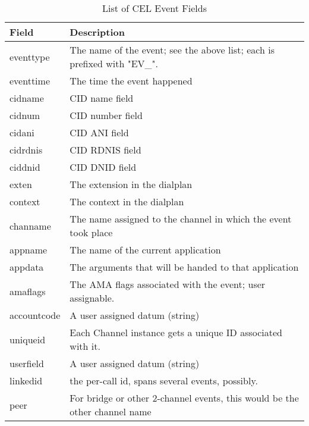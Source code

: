 \begin{table}[h]
  \begin{tabular}{ | l | p{10cm} | }
    \hline
    Field         & Description                                                                \\ \hline \hline
    eventtype     & The name of the event; see the above list; each is prefixed with "EV\_".   \\ \hline
    eventtime     & The time the event happened                                                \\ \hline
    cidname       & CID name field                                                             \\ \hline
    cidnum        & CID number field                                                           \\ \hline
    cidani        & CID ANI field                                                              \\ \hline
    cidrdnis      & CID RDNIS field                                                            \\ \hline
    ciddnid       & CID DNID field                                                             \\ \hline
    exten         & The extension in the dialplan                                              \\ \hline
    context       & The context in the dialplan                                                \\ \hline
    channame      & The name assigned to the channel in which the event took place             \\ \hline
    appname       & The name of the current application                                        \\ \hline
    appdata       & The arguments that will be handed to that application                      \\ \hline
    amaflags      & The AMA flags associated with the event; user assignable.                  \\ \hline
    accountcode   & A user assigned datum (string)                                             \\ \hline
    uniqueid      & Each Channel instance gets a unique ID associated with it.                 \\ \hline
    userfield     & A user assigned datum (string)                                             \\ \hline
    linkedid      & the per-call id, spans several events, possibly.                           \\ \hline
    peer          & For bridge or other 2-channel events, this would be the other channel name \\
    \hline
  \end{tabular}
  \caption{List of CEL Event Fields}
  \label{field-table}
\end{table}

